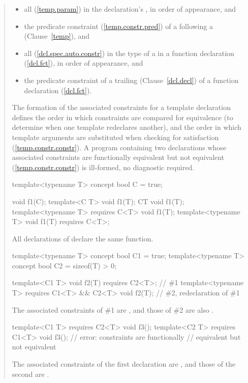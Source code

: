 \begin{quote}
\begin{itemize}
\item all  
      (\ref{temp.param}) in the declaration's 
      , in 
      order of appearance, and

\item the predicate constraint (\ref{temp.constr.pred}) 
      of a  following a 
       (Clause~\ref{temp}), and

\item all  
      (\ref{dcl.spec.auto.constr}) in the type of a 
       in a function declaration
      (\ref{dcl.fct}), in order of appearance, and

\item the predicate constraint of a trailing 
       (Clause~\ref{dcl.decl}) 
      of a function declaration (\ref{dcl.fct}).
\end{itemize}
% 
The formation of the associated constraints for a template declaration
defines the order in which constraints are compared for equivalence
(to determine when one template redeclares another), and the order in
which template arguments are substituted when checking for satisfaction
(\ref{temp.constr.constr}).
% 
A program containing two declarations whose associated constraints are 
functionally equivalent but not equivalent (\ref{temp.constr.constr}) is 
ill-formed, no diagnostic required.
% 
\enterexample
\begin{codeblock}
template<typename T> concept bool C = true;

void f1(C);
template<C T> void f1(T);
C{T} void f1(T);
template<typename T> requires C<T> void f1(T);
template<typename T> void f1(T) requires C<T>;
\end{codeblock}
All declarations of  declare the same function.
% 
\begin{codeblock}
template<typename T> concept bool C1 = true;
template<typename T> concept bool C2 = sizeof(T) > 0;

template<C1 T> void f2(T) requires C2<T>;                // \#1
template<typename T> requires C1<T> && C2<T> void f2(T); // \#2, redeclaration of \#1
\end{codeblock}
The associated constraints of \#1 are , and
those of \#2 are also .
% 
\begin{codeblock}
template<C1 T> requires C2<T> void f3();
template<C2 T> requires C1<T> void f3(); // error: constraints are functionally
                                         // equivalent but not equivalent
\end{codeblock}
% 
The associated constraints of the first declaration are
, and those of the second are
.
\exitexample


\end{quote}

